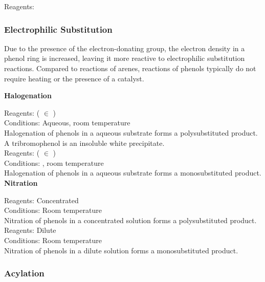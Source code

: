 \documentclass[../main]{subfiles}
\begin{document}
	Reagents:  \\


	\subsubsection{Electrophilic Substitution}

	Due to the presence of the electron-donating  group, the electron density in a phenol ring is increased, leaving it more reactive to electrophilic substitution reactions. Compared to reactions of arenes, reactions of phenols typically do not require heating or the presence of a catalyst.

	\noindent \textbf{Halogenation}

	Reagents:  ( \(\in\) ) \\
	Conditions:  Aqueous, room temperature\\

	Halogenation of phenols in a aqueous substrate forms a polysubstituted product. A tribromophenol is an insoluble white precipitate. \\

	Reagents:  ( \(\in\) ) \\
	Conditions: , room temperature\\

	Halogenation of phenols in a aqueous substrate forms a monosubstituted product. \\

	\noindent \textbf{Nitration}

	Reagents: Concentrated  \\
	Conditions: Room temperature\\

	Nitration of phenols in a concentrated solution forms a polysubstituted product. \\

	Reagents: Dilute  \\
	Conditions: Room temperature\\

	Nitration of phenols in a dilute solution forms a monosubstituted product. \\

	\subsubsection{Acylation}
\end{document}
